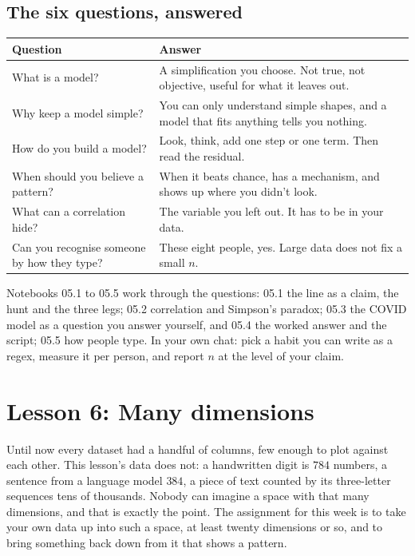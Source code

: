 \documentclass[12pt, a4paper]{article}
\theoremstyle{definition}
\theoremstyle{remark}
\begin{document}
\subsection{The six questions, answered}
\label{sec:lesson5-summary}
\begin{table}[H]
\centering
\begin{tabularx}{\textwidth}{@{}l X@{}}
\toprule
\textbf{Question} & \textbf{Answer} \\
\midrule
What is a model? & A simplification you choose. Not true, not objective, useful for what it leaves out. \\
Why keep a model simple? & You can only understand simple shapes, and a model that fits anything tells you nothing. \\
How do you build a model? & Look, think, add one step or one term. Then read the residual. \\
When should you believe a pattern? & When it beats chance, has a mechanism, and shows up where you didn't look. \\
What can a correlation hide? & The variable you left out. It has to be in your data. \\
Can you recognise someone by how they type? & These eight people, yes. Large data does not fix a small $n$. \\
\bottomrule
\end{tabularx}
\end{table}

Notebooks 05.1 to 05.5 work through the questions: 05.1 the line as a claim, the hunt and the three legs; 05.2 correlation and Simpson's paradox; 05.3 the COVID model as a question you answer yourself, and 05.4 the worked answer and the script; 05.5 how people type. In your own chat: pick a habit you can write as a regex, measure it per person, and report $n$ at the level of your claim.
\newpage

\section{Lesson 6: Many dimensions}
\label{sec:lesson6}
Until now every dataset had a handful of columns, few enough to plot against each other. This lesson's data does not: a handwritten digit is $784$ numbers, a sentence from a language model $384$, a piece of text counted by its three-letter sequences tens of thousands. Nobody can imagine a space with that many dimensions, and that is exactly the point. The assignment for this week is to take your own data up into such a space, at least twenty dimensions or so, and to bring something back down from it that shows a pattern.
\end{document}
